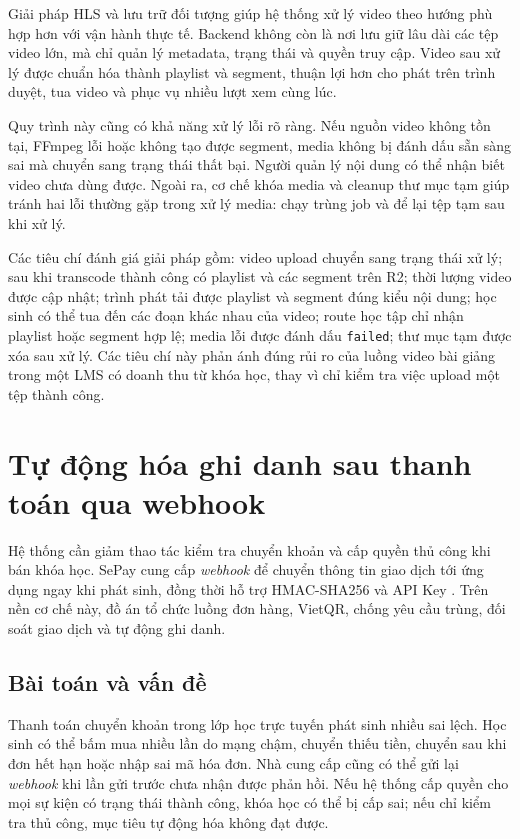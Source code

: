 \documentclass[../DoAn.tex]{subfiles}
\begin{document}
Giải pháp HLS và lưu trữ đối tượng giúp hệ thống xử lý video theo hướng phù hợp hơn với vận hành thực tế. Backend không còn là nơi lưu giữ lâu dài các tệp video lớn, mà chỉ quản lý metadata, trạng thái và quyền truy cập. Video sau xử lý được chuẩn hóa thành playlist và segment, thuận lợi hơn cho phát trên trình duyệt, tua video và phục vụ nhiều lượt xem cùng lúc.

Quy trình này cũng có khả năng xử lý lỗi rõ ràng. Nếu nguồn video không tồn tại, FFmpeg lỗi hoặc không tạo được segment, media không bị đánh dấu sẵn sàng sai mà chuyển sang trạng thái thất bại. Người quản lý nội dung có thể nhận biết video chưa dùng được. Ngoài ra, cơ chế khóa media và cleanup thư mục tạm giúp tránh hai lỗi thường gặp trong xử lý media: chạy trùng job và để lại tệp tạm sau khi xử lý.

Các tiêu chí đánh giá giải pháp gồm: video upload chuyển sang trạng thái xử lý; sau khi transcode thành công có playlist và các segment trên R2; thời lượng video được cập nhật; trình phát tải được playlist và segment đúng kiểu nội dung; học sinh có thể tua đến các đoạn khác nhau của video; route học tập chỉ nhận playlist hoặc segment hợp lệ; media lỗi được đánh dấu \texttt{failed}; thư mục tạm được xóa sau xử lý. Các tiêu chí này phản ánh đúng rủi ro của luồng video bài giảng trong một LMS có doanh thu từ khóa học, thay vì chỉ kiểm tra việc upload một tệp thành công.

\section{Tự động hóa ghi danh sau thanh toán qua webhook}
\label{section:5.4}

Hệ thống cần giảm thao tác kiểm tra chuyển khoản và cấp quyền thủ công khi bán khóa học. SePay cung cấp \textit{webhook} để chuyển thông tin giao dịch tới ứng dụng ngay khi phát sinh, đồng thời hỗ trợ HMAC-SHA256 và API Key \cite{sepay_webhook_docs}. Trên nền cơ chế này, đồ án tổ chức luồng đơn hàng, VietQR, chống yêu cầu trùng, đối soát giao dịch và tự động ghi danh.

\subsection{Bài toán và vấn đề}
\label{section:5.4.1}

Thanh toán chuyển khoản trong lớp học trực tuyến phát sinh nhiều sai lệch. Học sinh có thể bấm mua nhiều lần do mạng chậm, chuyển thiếu tiền, chuyển sau khi đơn hết hạn hoặc nhập sai mã hóa đơn. Nhà cung cấp cũng có thể gửi lại \textit{webhook} khi lần gửi trước chưa nhận được phản hồi. Nếu hệ thống cấp quyền cho mọi sự kiện có trạng thái thành công, khóa học có thể bị cấp sai; nếu chỉ kiểm tra thủ công, mục tiêu tự động hóa không đạt được.
\end{document}
